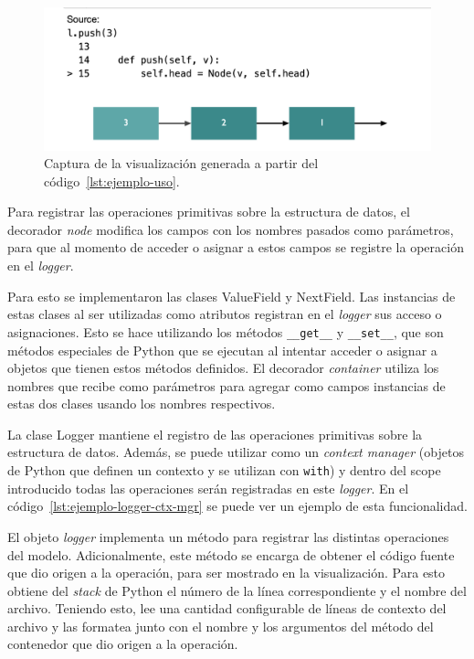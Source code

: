 \begin{figure}[h]
    \centering
    \includegraphics[width=\linewidth]{imagenes/ejemplos/ejemplo}
    \caption{Captura de la visualización generada a partir del código~\ref{lst:ejemplo-uso}.}
    \label{fig:visualizacion_ej}
    \centering
\end{figure}

Para registrar las operaciones primitivas sobre la estructura de datos, el decorador \textit{node} modifica los campos con los nombres pasados como parámetros, para que al momento de acceder o asignar a estos campos se registre la operación en el \textit{logger}.

Para esto se implementaron las clases ValueField y NextField. Las instancias de estas clases al ser utilizadas como atributos registran en el \textit{logger} sus acceso o asignaciones. Esto se hace utilizando los métodos \texttt{\_\_get\_\_} y \texttt{\_\_set\_\_}, que son métodos especiales de Python que se ejecutan al intentar acceder o asignar a objetos que tienen estos métodos definidos. El decorador \textit{container} utiliza los nombres que recibe como parámetros para agregar como campos instancias de estas dos clases usando los nombres respectivos.

La clase Logger mantiene el registro de las operaciones primitivas sobre la estructura de datos. Además, se puede utilizar como un \textit{context manager} (objetos de Python que definen un contexto y se utilizan con \texttt{with}) y dentro del scope introducido todas las operaciones serán registradas en este \textit{logger}. En el código~\ref{lst:ejemplo-logger-ctx-mgr} se puede ver un ejemplo de esta funcionalidad.

El objeto \textit{logger} implementa un método para registrar las distintas operaciones del modelo. Adicionalmente, este método se encarga de obtener el código fuente que dio origen a la operación, para ser mostrado en la visualización. Para esto obtiene del \textit{stack} de Python el número de la línea correspondiente y el nombre del archivo. Teniendo esto, lee una cantidad configurable de líneas de contexto del archivo y las formatea junto con el nombre y los argumentos del método del contenedor que dio origen a la operación.

